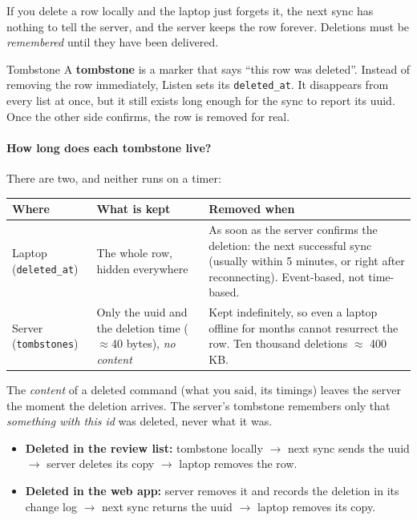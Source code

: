 \documentclass[11pt,a4paper]{article}
\begin{document}
If you delete a row locally and the laptop just forgets it, the next sync has nothing to tell
the server, and the server keeps the row forever. Deletions must be \emph{remembered} until
they have been delivered.

\begin{concept}{Tombstone}
A \textbf{tombstone} is a marker that says ``this row was deleted''. Instead of removing the row
immediately, Listen sets its \texttt{deleted\_at}. It disappears from every list at once,
but it still exists long enough for the sync to report its uuid. Once the other side confirms,
the row is removed for real.
\end{concept}

\paragraph{How long does each tombstone live?} There are two, and neither runs on a timer:
\begin{center}
\renewcommand{\arraystretch}{1.2}
\begin{tabularx}{\textwidth}{l X X}
\toprule
\textbf{Where} & \textbf{What is kept} & \textbf{Removed when} \\
\midrule
Laptop (\texttt{deleted\_at}) & The whole row, hidden everywhere &
As soon as the server confirms the deletion: the next successful sync (usually within 5 minutes,
or right after reconnecting). Event-based, not time-based. \\
Server (\texttt{tombstones}) & Only the uuid and the deletion time ($\approx$40 bytes), \emph{no content} &
Kept indefinitely, so even a laptop offline for months cannot resurrect the row. Ten thousand
deletions $\approx$ 400\,KB. \\
\bottomrule
\end{tabularx}
\end{center}
\noindent The \emph{content} of a deleted command (what you said, its timings) leaves the server
the moment the deletion arrives. The server's tombstone remembers only that \emph{something with
this id} was deleted, never what it was.

\begin{itemize}[nosep]
  \item \textbf{Deleted in the review list:} tombstone locally $\to$ next sync sends the uuid
        $\to$ server deletes its copy $\to$ laptop removes the row.
  \item \textbf{Deleted in the web app:} server removes it and records the deletion in its
        change log $\to$ next sync returns the uuid $\to$ laptop removes its copy.
\end{itemize}
\end{document}

